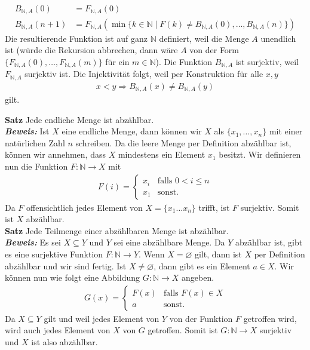 \begin{itemize}
        \begin{align*}
        B_{\mathbb{N},A}(0) &= F_{\mathbb{N},A}(0)\\
        B_{\mathbb{N},A}(n+1) &= F_{\mathbb{N},A}(\min\{k\in\mathbb{N}\mid F(k)\neq B_{\mathbb{N},A}(0),\dots,B_{\mathbb{N},A}(n) \})
        \end{align*}
        Die resultierende Funktion ist auf ganz $\mathbb{N}$ definiert, weil die Menge $A$ unendlich ist (würde die Rekursion abbrechen, dann wäre $A$ von der Form $\{F_{\mathbb{N},A}(0),\dots,F_{\mathbb{N},A}(m)\}$ für ein $m\in\mathbb{N}$). Die Funktion $B_{\mathbb{N},A}$ ist surjektiv, weil $F_{\mathbb{N},A}$ surjektiv ist. Die Injektivität folgt, weil per Konstruktion für alle $x,y$
        \begin{align*}
        x<y \Rightarrow B_{\mathbb{N},A}(x) \neq B_{\mathbb{N},A}(y)
        \end{align*}
        gilt.\qedhere
    \end{itemize}
\textbf{Satz } Jede endliche Menge ist abzählbar. \\
\textit{\textbf{Beweis: }}
Ist $X$ eine endliche Menge, dann können wir $X$ als $\{x_1,\dots,x_n\}$ mit einer natürlichen Zahl $n$ schreiben. Da die leere Menge per Definition abzählbar ist, können wir annehmen, dass $X$ mindestens ein Element $x_1$ besitzt. Wir definieren nun die Funktion $F:\mathbb{N}\to X$ mit
\begin{align*}
F(i)=\begin{cases}
x_i&\text{falls }0<i\leq n\\
x_1&\text{sonst.}
\end{cases}
\end{align*}
Da $F$ offensichtlich jedes Element von $X=\{x_1\dots x_n\}$ trifft, ist $F$ surjektiv. Somit ist $X$ abzählbar. \\

\textbf{Satz } Jede Teilmenge einer abzählbaren Menge ist abzählbar.\\
\textit{\textbf{Beweis: }}
Es sei $X\subseteq Y$ und $Y$ sei eine abzählbare Menge. Da $Y$ abzählbar ist,
gibt es eine surjektive Funktion $F:\mathbb{N}\to Y$. Wenn $X=\varnothing$ gilt, dann
ist $X$ per Definition abzählbar und wir sind fertig. Ist $X\neq\varnothing$,
dann gibt es ein Element $a\in X$. Wir können nun wie folgt eine Abbildung
$G:\mathbb{N}\to X$ angeben.
\begin{align*}
G(x)=\begin{cases}
F(x)&\text{falls }F(x)\in X\\
a&\text{sonst.}
\end{cases}
\end{align*}
Da $X\subseteq Y$ gilt und weil jedes Element von $Y$ von der Funktion $F$
getroffen wird, wird auch jedes Element von $X$ von $G$ getroffen. Somit
ist $G:\mathbb{N}\to X$ surjektiv und $X$ ist also abzählbar. \\

